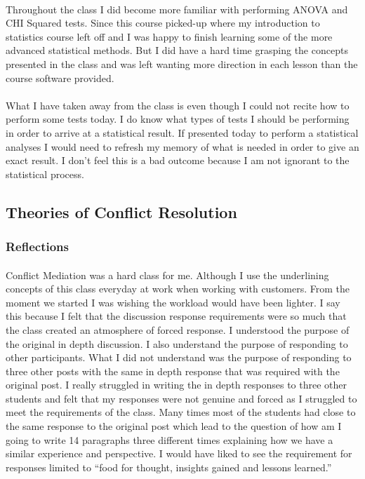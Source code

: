 \documentclass[12pt,titlepage]{article}
\begin{document}
\paragraph {}
Throughout the class I did become more familiar with performing ANOVA and CHI Squared tests. Since this course picked-up where my introduction to statistics course left off and I was happy to finish learning some of the more advanced statistical methods. But I did have a hard time grasping the concepts presented in the class and was left wanting more direction in each lesson than the course software provided.
\paragraph {}
What I have taken away from the class is even though I could not recite how to perform some tests today. I do know what types of tests I should be performing in order to arrive at a statistical result. If presented today to perform a statistical analyses I would need to refresh my memory of what is needed in order to give an exact result. I don't feel this is a bad outcome because I am not ignorant to the statistical process.

\restoregeometry


\subsection{Theories of Conflict Resolution}
\subsubsection{Reflections}
\paragraph {}
Conflict Mediation was a hard class for me. Although I use the underlining concepts of this class everyday at work when working with customers. From the moment we started I was wishing the workload would have been lighter. I say this because I felt that the discussion response requirements were so much that the class created an atmosphere of forced response. I understood the purpose of the original in depth discussion. I also understand the purpose of responding to other participants. What I did not understand was the purpose of responding to three other posts with the same in depth response that was required with the original post. I really struggled in writing the in depth responses to three other students and felt that my responses were not genuine and forced as I struggled to meet the requirements of the class. Many times most of the students had close to the same response to the original post which lead to the question of how am I going to write 14 paragraphs three different times explaining how we have a similar experience and perspective. I would have liked to see the requirement for responses limited to “food for thought, insights gained and lessons learned.”
\end{document}
